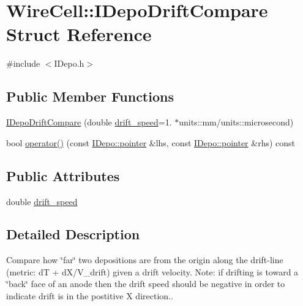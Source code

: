 \hypertarget{struct_wire_cell_1_1_i_depo_drift_compare}{}\section{Wire\+Cell\+:\+:I\+Depo\+Drift\+Compare Struct Reference}
\label{struct_wire_cell_1_1_i_depo_drift_compare}


{\ttfamily \#include $<$I\+Depo.\+h$>$}

\subsection*{Public Member Functions}
\begin{DoxyCompactItemize}
\item 
\hyperlink{struct_wire_cell_1_1_i_depo_drift_compare_a51915e2fbf86233171f3dc8125787593}{I\+Depo\+Drift\+Compare} (double \hyperlink{struct_wire_cell_1_1_i_depo_drift_compare_ae655f841d0c24e759f1a5683ce656049}{drift\+\_\+speed}=1. $\ast$units\+::mm/units\+::microsecond)
\item 
bool \hyperlink{struct_wire_cell_1_1_i_depo_drift_compare_a1bea72152256455c6db7cb5a425c19df}{operator()} (const \hyperlink{class_wire_cell_1_1_i_data_aff870b3ae8333cf9265941eef62498bc}{I\+Depo\+::pointer} \&lhs, const \hyperlink{class_wire_cell_1_1_i_data_aff870b3ae8333cf9265941eef62498bc}{I\+Depo\+::pointer} \&rhs) const
\end{DoxyCompactItemize}
\subsection*{Public Attributes}
\begin{DoxyCompactItemize}
\item 
double \hyperlink{struct_wire_cell_1_1_i_depo_drift_compare_ae655f841d0c24e759f1a5683ce656049}{drift\+\_\+speed}
\end{DoxyCompactItemize}


\subsection{Detailed Description}
Compare how \char`\"{}far\char`\"{} two depositions are from the origin along the drift-\/line (metric\+: dT + d\+X/\+V\+\_\+drift) given a drift velocity. Note\+: if drifting is toward a \char`\"{}back\char`\"{} face of an anode then the drift speed should be negative in order to indicate drift is in the postitive X direction.. 

